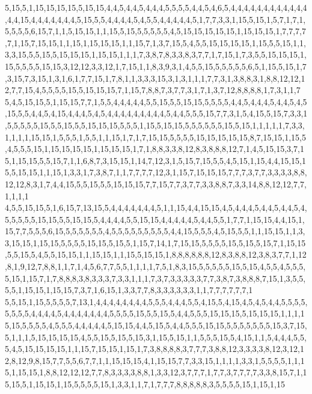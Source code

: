 5,15,5,1,15,15,15,15,5,15,15,4,4,5,4,4,5,4,4,4,5,5,5,5,4,4,5,4,6,5,4,4,4,4,4,4,4,4,4,4,4,4,4,4,15,4,4,4,4,4,4,4,5,15,5,5,4,4,4,4,5,4,5,5,4,4,4,4,4,5,1,7,7,3,3,1,15,5,15,1,5,7,1,7,1,5,5,5,5,6,15,7,1,1,5,15,15,1,1,15,5,15,5,5,5,5,5,4,5,15,15,15,15,15,1,15,15,15,1,7,7,7,7,7,1,15,7,15,15,1,1,15,1,15,15,15,1,1,15,7,1,3,7,15,5,4,5,5,15,15,15,15,1,15,5,5,15,1,1,3,3,15,5,5,15,5,15,15,15,1,15,15,1,1,1,7,3,8,7,8,3,3,8,3,7,7,1,7,15,1,7,3,5,5,15,15,15,1,15,5,5,5,5,15,15,3,12,12,3,3,12,1,7,15,1,1,8,3,9,3,1,4,5,5,15,5,5,5,5,5,6,5,1,15,5,15,1,7,3,15,7,3,15,1,3,1,6,1,7,7,15,1,7,8,1,1,3,3,3,15,3,1,3,1,1,1,7,7,3,1,3,8,8,3,1,8,8,12,12,12,7,7,15,4,5,5,5,5,15,5,15,15,15,7,1,15,7,8,8,7,3,7,7,3,1,7,1,3,7,12,8,8,8,8,1,7,3,1,1,7
5,4,5,15,15,5,1,15,15,7,7,1,5,5,4,4,4,4,4,5,5,15,5,5,15,15,5,5,5,5,4,4,5,4,4,4,5,4,4,5,4,5,15,5,5,4,4,5,4,15,4,4,4,5,4,5,4,4,4,4,4,4,4,4,4,5,4,4,5,5,5,15,7,7,3,1,5,4,15,5,15,7,3,3,1,5,5,5,5,5,15,5,5,15,5,5,15,15,15,5,5,5,1,15,5,15,15,5,5,5,5,5,5,15,5,15,1,1,1,1,1,7,3,3,1,1,1,1,15,15,1,5,5,5,1,5,5,1,1,15,1,7,1,7,15,15,5,5,5,5,15,15,15,15,15,8,7,15,15,1,15,5,4,5,5,5,15,1,15,15,15,15,1,15,15,15,1,7,1,8,8,3,3,8,12,8,3,8,8,8,12,7,1,4,5,15,15,3,7,15,1,15,15,5,5,15,7,1,1,6,8,7,3,15,15,1,14,7,12,3,1,5,15,7,15,5,5,4,5,15,1,15,4,4,15,15,15,5,15,15,1,1,15,1,3,3,1,7,3,8,7,1,1,7,7,7,7,12,3,1,15,7,15,15,15,7,7,7,3,7,7,3,3,3,3,8,8,12,12,8,3,1,7,4,4,15,5,5,15,5,5,15,15,15,7,7,15,7,7,3,7,7,3,3,8,8,7,3,3,14,8,8,12,12,7,7,1,1,1,1
4,5,5,15,15,5,1,6,15,7,13,15,5,4,4,4,4,4,4,4,5,1,1,15,4,4,15,15,4,5,4,4,4,5,4,4,5,4,4,5,4,5,5,5,5,5,15,15,5,5,15,15,5,4,4,4,4,5,5,15,15,4,4,4,4,4,5,4,4,5,5,1,7,7,1,15,15,4,4,15,1,15,7,7,5,5,5,6,15,5,5,5,5,5,5,4,5,5,5,5,5,5,5,5,5,4,4,15,5,5,5,4,5,15,5,5,1,1,15,15,1,1,3,3,15,15,1,15,15,5,5,5,5,15,15,5,15,5,1,15,7,14,1,7,15,15,5,5,5,5,15,5,15,5,15,7,1,15,15,5,5,15,5,4,5,5,15,15,1,1,15,15,1,1,15,5,15,15,1,8,8,8,8,8,8,12,8,3,8,8,12,3,8,3,7,7,1,12,8,1,9,12,7,8,8,1,1,7,1,4,5,6,7,7,5,5,1,1,1,1,7,5,1,8,3,15,5,5,5,5,5,15,5,15,4,5,5,4,5,5,5,5,15,1,15,7,1,7,8,8,8,3,8,3,3,3,7,3,3,1,1,1,7,3,7,3,3,3,3,3,7,7,3,8,7,3,8,8,8,7,15,1,3,5,5,5,5,1,15,15,1,15,15,7,3,7,1,6,15,1,3,3,7,7,8,3,3,3,3,3,3,1,1,7,7,7,7,7,7,1
5,5,15,1,15,5,5,5,5,7,13,1,4,4,4,4,4,4,4,4,5,5,5,4,4,4,5,5,4,15,5,4,15,4,5,4,5,4,4,5,5,5,5,5,5,5,5,4,4,4,4,5,4,4,4,4,4,4,4,5,5,5,5,15,5,5,15,5,4,4,5,5,5,15,15,15,5,15,15,15,1,1,1,15,15,5,5,5,5,4,5,5,5,4,4,4,4,4,5,15,15,4,4,5,15,5,4,4,5,5,5,15,15,5,5,5,5,5,5,5,15,3,7,15,5,1,1,1,5,15,15,15,15,4,5,5,15,5,15,5,15,3,1,15,5,15,1,1,5,5,5,15,5,4,15,1,1,5,4,4,4,5,5,5,4,5,15,15,15,15,1,1,15,7,15,15,1,15,1,7,3,8,8,8,8,3,7,7,7,3,8,8,12,3,3,3,3,8,12,3,12,12,8,12,9,8,15,7,7,5,5,6,7,7,1,1,15,15,15,4,1,15,15,7,7,3,3,15,1,1,1,1,3,3,1,5,5,5,5,1,1,15,1,15,15,1,8,8,12,12,12,7,7,8,3,3,3,3,8,8,1,3,3,12,3,7,7,7,1,7,7,3,7,7,7,7,3,3,8,15,7,1,15,15,5,1,15,15,1,15,5,5,5,5,15,1,3,3,1,1,7,1,7,7,7,8,8,8,8,8,3,5,5,5,5,15,1,15,1,15
